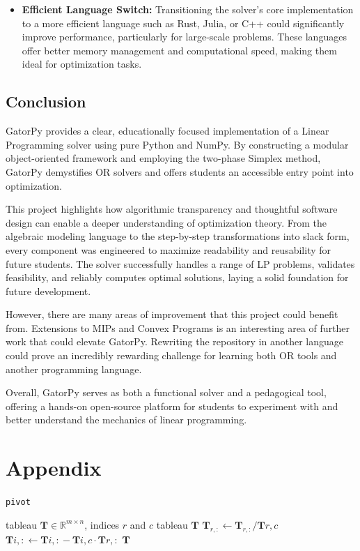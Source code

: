 \documentclass[conference]{IEEEtran}
\begin{document}
\begin{itemize}
    \item \textbf{Efficient Language Switch:} Transitioning the solver's core implementation to a more efficient language such as Rust, Julia, or C++ could significantly improve performance, particularly for large-scale problems. 
    These languages offer better memory management and computational speed, making them ideal for optimization tasks.
\end{itemize}

\subsection{Conclusion}
GatorPy provides a clear, educationally focused implementation of a Linear Programming solver using pure Python and NumPy. 
By constructing a modular object-oriented framework and employing the two-phase Simplex method, GatorPy demystifies OR solvers and offers students an accessible entry point into optimization.

This project highlights how algorithmic transparency and thoughtful software design can enable a deeper understanding of optimization theory. 
From the algebraic modeling language to the step-by-step transformations into slack form, every component was engineered to maximize readability and reusability for future students. 
The solver successfully handles a range of LP problems, validates feasibility, and reliably computes optimal solutions, laying a solid foundation for future development.

However, there are many areas of improvement that this project could benefit from. 
Extensions to MIPs and Convex Programs is an interesting area of further work that could elevate GatorPy.
Rewriting the repository in another language could prove an incredibly rewarding challenge for learning both OR tools and another programming language.

Overall, GatorPy serves as both a functional solver and a pedagogical tool, offering a hands-on open-source platform for students to experiment with and better understand the mechanics of linear programming.

\clearpage
\section{Appendix}
\label{appendix}
\begin{algorithm}
    \caption{\texttt{pivot}}
    \label{alg:pivot}
    \begin{algorithmic}[1]
    \Require tableau $\textbf{T} \in \mathbb{R}^{m \times n}$, indices $r$ and $c$
    \Ensure tableau $\textbf{T}$
    \State $\textbf{T}_{r, :} \gets \textbf{T}_{r, :} / \textbf{T}{r, c}$ 
        \State $\textbf{T}{i, :} \gets \textbf{T}{i, :} - \textbf{T}{i, c} \cdot \textbf{T}{r, :}$ 
    \EndFor
    \State \Return $\textbf{T}$ 
    \end{algorithmic}
    \end{algorithm}
    
\end{document}
